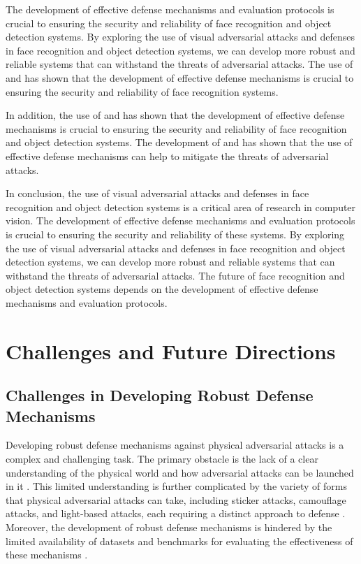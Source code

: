 \documentclass[11pt]{article}
\begin{document}
The development of effective defense mechanisms and evaluation protocols is crucial to ensuring the security and reliability of face recognition and object detection systems. By exploring the use of visual adversarial attacks and defenses in face recognition and object detection systems, we can develop more robust and reliable systems that can withstand the threats of adversarial attacks. The use of \cite{ref12} and \cite{ref127} has shown that the development of effective defense mechanisms is crucial to ensuring the security and reliability of face recognition systems.

In addition, the use of \cite{ref128} and \cite{ref129} has shown that the development of effective defense mechanisms is crucial to ensuring the security and reliability of face recognition and object detection systems. The development of \cite{ref9} and \cite{ref130} has shown that the use of effective defense mechanisms can help to mitigate the threats of adversarial attacks.

In conclusion, the use of visual adversarial attacks and defenses in face recognition and object detection systems is a critical area of research in computer vision. The development of effective defense mechanisms and evaluation protocols is crucial to ensuring the security and reliability of these systems. By exploring the use of visual adversarial attacks and defenses in face recognition and object detection systems, we can develop more robust and reliable systems that can withstand the threats of adversarial attacks. The future of face recognition and object detection systems depends on the development of effective defense mechanisms and evaluation protocols.

\section{Challenges and Future Directions}

\subsection{Challenges in Developing Robust Defense Mechanisms}

Developing robust defense mechanisms against physical adversarial attacks is a complex and challenging task. The primary obstacle is the lack of a clear understanding of the physical world and how adversarial attacks can be launched in it \cite{ref34}. This limited understanding is further complicated by the variety of forms that physical adversarial attacks can take, including sticker attacks, camouflage attacks, and light-based attacks, each requiring a distinct approach to defense \cite{ref11}. Moreover, the development of robust defense mechanisms is hindered by the limited availability of datasets and benchmarks for evaluating the effectiveness of these mechanisms \cite{ref110}.
\end{document}
